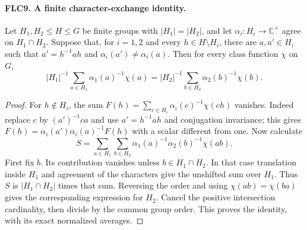 \paragraph{FLC9. A finite character-exchange identity.}
\label{claim:FLC9}
Let $H_1,H_2\le H\le G$ be finite groups with
$|H_1|=|H_2|$, and let $\alpha_i:H_i\to\mathbb C^\times$
agree on $H_1\cap H_2$.
Suppose that, for $i=1,2$ and every $h\in H\setminus H_i$,
there are $a,a'\in H_i$ such that
$a'=h^{-1}ah$ and $\alpha_i(a')\ne\alpha_i(a)$.
Then for every class function $\chi$ on $G$,
\[
 |H_1|^{-1}\sum_{a\in H_1}\alpha_1(a)^{-1}\chi(a)
       =|H_2|^{-1}\sum_{b\in H_2}\alpha_2(b)^{-1}\chi(b).
 \tag{FLC.14}
\]
\begin{proof}
For $h\notin H_i$, the sum
$F(h)=\sum_{c\in H_i}\alpha_i(c)^{-1}\chi(ch)$ vanishes.
Indeed replace $c$ by $(a')^{-1}ca$ and use
$a'=h^{-1}ah$ and conjugation invariance; this gives
$F(h)=\alpha_i(a')\alpha_i(a)^{-1}F(h)$ with a scalar
different from one.
Now calculate
\[
 S=\sum_{a\in H_1}\sum_{b\in H_2}
        \alpha_1(a)^{-1}\alpha_2(b)^{-1}\chi(ab).
\]
First fix $b$.  Its contribution vanishes unless
$b\in H_1\cap H_2$.  In that case translation inside $H_1$
and agreement of the characters give the unshifted sum over
$H_1$.  Thus $S$ is $|H_1\cap H_2|$ times that sum.
Reversing the order and using $\chi(ab)=\chi(ba)$ gives the
corresponding expression for $H_2$.  Cancel the positive
intersection cardinality, then divide by the common group
order.  This proves the identity, with its exact normalized
averages.
\end{proof}

